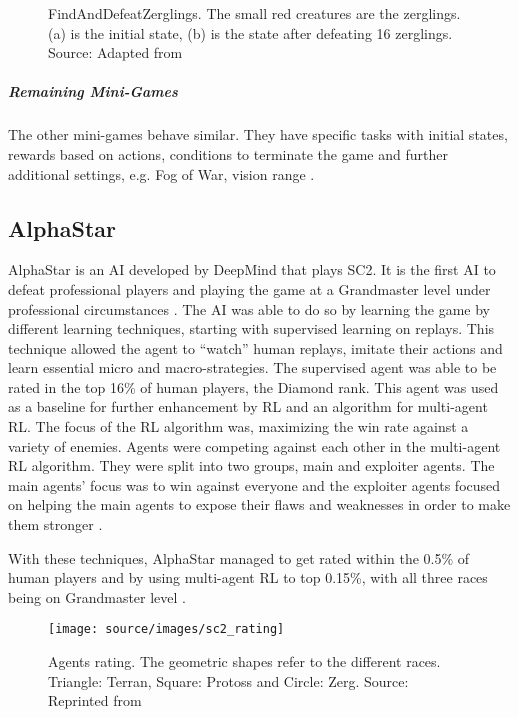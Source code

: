 \begin{figure}[H]
	\centering
	\qquad
	\caption[FindAndDefeatZerglings]{FindAndDefeatZerglings. The small red creatures are the zerglings. (a) is the initial state, (b) is the state after defeating 16 zerglings. Source: Adapted from \protect\cite{sc2_zergling}}
\end{figure}
\subparagraph{Remaining Mini-Games}
The other mini-games behave similar. They have specific tasks with initial states, rewards based on actions, conditions to terminate the game and further additional settings, e.g. Fog of War, vision range \cite{2017arXiv170804782V}.

\subsection{AlphaStar} \label{ssec:alphastar}
AlphaStar is an AI developed by DeepMind that plays SC2. It is the first AI to defeat professional players and playing the game at a Grandmaster level under professional circumstances \cite{Vinyals2019}. The AI was able to do so by learning the game by different learning techniques, starting with supervised learning on replays. This technique allowed the agent to ``watch'' human replays, imitate their actions and learn essential micro and macro-strategies. The supervised agent was able to be rated in the top 16\% of human players, the Diamond rank. This agent was used as a baseline for further enhancement by RL and an algorithm for multi-agent RL. The focus of the RL algorithm was, maximizing the win rate against a variety of enemies. Agents were competing against each other in the multi-agent RL algorithm. They were split into two groups, main and exploiter agents. The main agents' focus was to win against everyone and the exploiter agents focused on helping the main agents to expose their flaws and weaknesses in order to make them stronger \cite{Vinyals2019}. 

With these techniques, AlphaStar managed to get rated within the 0.5\% of human players and by using multi-agent RL to top 0.15\%, with all three races being on Grandmaster level \cite{Vinyals2019}.

\begin{figure}[H]%
	\texttt{[image: source/images/sc2\_rating]}%
	\caption[SC2 Agents rating]{Agents rating. The geometric shapes refer to the different races. Triangle: Terran, Square: Protoss and Circle: Zerg. Source: Reprinted from \protect\cite{Vinyals2019}}%
	\label{fig:elo}%
	\medskip
	\small
\end{figure}

